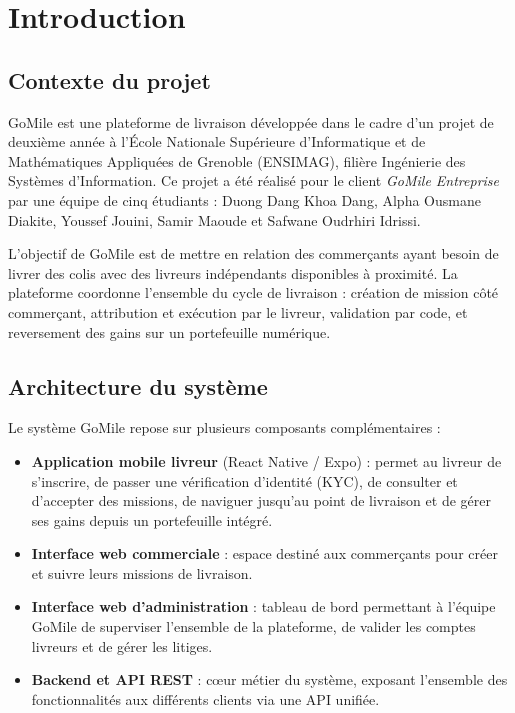 
\chapter{Introduction}

\section*{Contexte du projet}

GoMile est une plateforme de livraison développée dans le cadre d'un projet de deuxième année à l'École Nationale Supérieure d'Informatique et de Mathématiques Appliquées de Grenoble (ENSIMAG), filière Ingénierie des Systèmes d'Information. Ce projet a été réalisé pour le client \textit{GoMile Entreprise} par une équipe de cinq étudiants : Duong Dang Khoa Dang, Alpha Ousmane Diakite, Youssef Jouini, Samir Maoude et Safwane Oudrhiri Idrissi.

L'objectif de GoMile est de mettre en relation des commerçants ayant besoin de livrer des colis avec des livreurs indépendants disponibles à proximité. La plateforme coordonne l'ensemble du cycle de livraison : création de mission côté commerçant, attribution et exécution par le livreur, validation par code, et reversement des gains sur un portefeuille numérique.

\section*{Architecture du système}

Le système GoMile repose sur plusieurs composants complémentaires :

\begin{itemize}
    \item \textbf{Application mobile livreur} (React Native / Expo) : permet au livreur de s'inscrire, de passer une vérification d'identité (KYC), de consulter et d'accepter des missions, de naviguer jusqu'au point de livraison et de gérer ses gains depuis un portefeuille intégré.
    \item \textbf{Interface web commerciale} : espace destiné aux commerçants pour créer et suivre leurs missions de livraison.
    \item \textbf{Interface web d'administration} : tableau de bord permettant à l'équipe GoMile de superviser l'ensemble de la plateforme, de valider les comptes livreurs et de gérer les litiges.
    \item \textbf{Backend et API REST} : cœur métier du système, exposant l'ensemble des fonctionnalités aux différents clients via une API unifiée.
\end{itemize}

